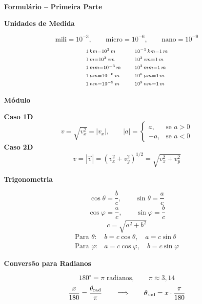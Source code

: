 \documentclass[12pt,a4paper,landscape]{article}
\newcommand{\secao}[1]{\textbf{#1}\par}
\begin{document}
\normalsize
\textbf{Formulário -- Primeira Parte}\par

\noindent
\begin{minipage}[t][0.46\textheight][t]{0.245\textwidth}
\vspace{0pt}
\secao{Unidades de Medida}
\begingroup
\small
\[
\text{mili} = 10^{-3}, \qquad \text{micro} = 10^{-6}, \qquad \text{nano} = 10^{-9}
\]
\[
\begin{array}{>{\scriptstyle}l<{} @{\qquad} >{\scriptstyle}l<{}}
1\,km = 10^3\,m & 10^{-3}\,km = 1\,m \\
1\,m = 10^2\,cm & 10^2\,cm = 1\,m \\
1\,mm = 10^{-3}\,m & 10^3\,mm = 1\,m \\
1\,\mu m = 10^{-6}\,m & 10^6\,\mu m = 1\,m \\
1\,nm = 10^{-9}\,m & 10^9\,nm = 1\,m
\end{array}
\]
\endgroup

\secao{Módulo}
\textbf{Caso 1D}
\[
v = \sqrt{v_x^2} = |v_x|,
\qquad
|a|=
\begin{cases}
a, & \text{se } a>0 \\
-a, & \text{se } a<0
\end{cases}
\]
\textbf{Caso 2D}
\[
v = |\vec{v}| = (v_x^2+v_y^2)^{1/2} = \sqrt{v_x^2+v_y^2}
\]
\end{minipage}\hfill
\begin{minipage}[t][0.46\textheight][t]{0.245\textwidth}
\vspace{0pt}
\secao{Trigonometria}
\begingroup
\small
\begin{center}
\end{center}
\[
\cos\theta=\frac{b}{c}, \qquad \sin\theta=\frac{a}{c}
\]
\[
\cos\varphi=\frac{a}{c}, \qquad \sin\varphi=\frac{b}{c}
\]
\[
c=\sqrt{a^2+b^2}
\]
\[
\begin{array}{ll}
\text{Para } \theta: & b=c\cos\theta,\quad a=c\sin\theta \\
\text{Para } \varphi: & a=c\cos\varphi,\quad b=c\sin\varphi
\end{array}
\]
\endgroup

\secao{Conversão para Radianos}
\begingroup
\small
\[
180^\circ = \pi \text{ radianos},\qquad \pi \approx 3,14
\]
\[
\frac{x}{180}=\frac{\theta_{\rm rad}}{\pi}
\qquad \Longrightarrow \qquad
\theta_{\rm rad}=x\cdot\frac{\pi}{180}
\]
\endgroup
\end{minipage}\hfill
\end{document}
